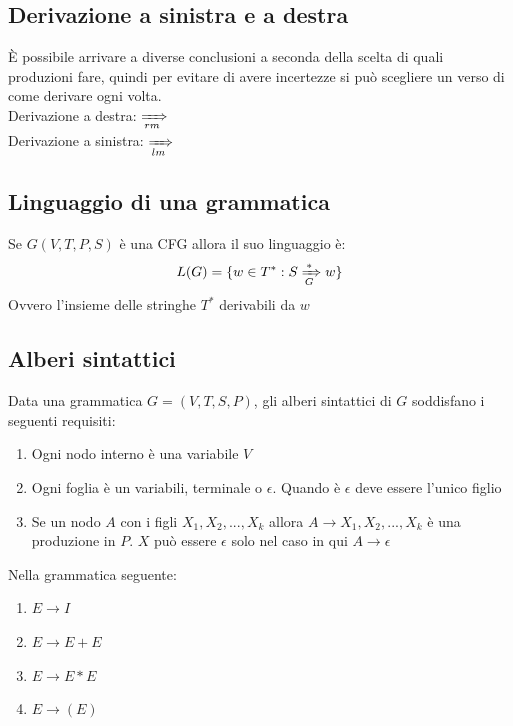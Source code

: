 \documentclass[12pt]{article}
\begin{document}
\subsection{Derivazione a sinistra e a destra}
È possibile arrivare a diverse conclusioni a seconda della scelta di quali produzioni fare, quindi per evitare di avere incertezze si può scegliere un verso di come derivare ogni volta.
\\ Derivazione a destra: $\xRightarrow[rm]{}$
\\ Derivazione a sinistra: $\xRightarrow[lm]{}$

\subsection{Linguaggio di una grammatica}
Se $G(V,T,P,S)$ è una CFG allora il suo linguaggio è:
\[L(G)=\{ w \in T^*:S \xRightarrow[G]{*} w \}\]
Ovvero l'insieme delle stringhe $T^*$ derivabili da $w$

\subsection{Alberi sintattici}
Data una grammatica $G=(V,T,S,P)$, gli alberi sintattici di $G$ soddisfano i seguenti requisiti: 
\begin{enumerate}
  \item Ogni nodo interno è una variabile $V$
  \item Ogni foglia è un variabili, terminale o $\epsilon$. Quando è $\epsilon$ deve essere l'unico figlio
  \item Se un nodo $A$ con i figli $X_1,X_2,...,X_k$ allora $A \rightarrow X_1,X_2,...,X_k$ è una produzione in $P$. $X$ può essere $\epsilon$ solo nel caso in qui $A \rightarrow \epsilon$
\end{enumerate}

Nella grammatica seguente: 
\begin{enumerate}
  \item $E \rightarrow I$
  \item $E \rightarrow E+E$
  \item $E \rightarrow E*E$
  \item $E \rightarrow (E)$
\end{enumerate}
\end{document}
